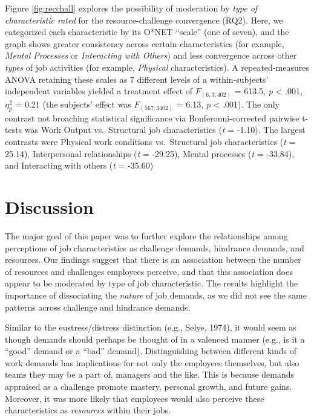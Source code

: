 \documentclass[
  jou]{apa6}
\begin{document}
Figure \ref{fig:recchall} explores the possibility of moderation by \emph{type of characteristic rated} for the resource-challenge convergence (RQ2). Here, we categorized each characteristic by its O*NET ``scale'' (one of seven), and the graph shows greater consistency across certain characteristics (for example, \emph{Mental Processes} or \emph{Interacting with Others}) and less convergence across other \emph{types} of job activities (for example, \emph{Physical} characteristics). A repeated-measures ANOVA retaining these scales as 7 different levels of a within-subjects' independent variables yielded a treatment effect of \(F_{(6, 3,402)}\) = 613.5, \emph{p} \textless{} .001, \(\eta^2_{p}\) = 0.21 (the subjects' effect was \(F_{(567, 3402)}\) = 6.13, \emph{p} \textless{} .001). The only contrast not broaching statistical significance via Bonferonni-corrected pairwise t-tests was Work Output vs.~Structural job characteristics (\emph{t} = -1.10). The largest contrasts were Physical work conditions vs.~Structural job characteristics (\emph{t} = 25.14), Interpersonal relationships (\emph{t} = -29.25), Mental processes (\emph{t} = -33.84), and Interacting with others (\emph{t} = -35.60)

\hypertarget{discussion}{%
\section{Discussion}\label{discussion}}

The major goal of this paper was to further explore the relationships among perceptions of job characteristics as challenge demands, hindrance demands, and resources. Our findings suggest that there is an association between the number of resources and challenges employees perceive, and that this association does appear to be moderated by type of job characteristic. The results highlight the importance of dissociating the \emph{nature} of job demands, as we did not see the same patterns across challenge and hindrance demands.

Similar to the eustress/distress distinction (e.g., Selye, 1974), it would seem as though demands should perhaps be thought of in a valenced manner (e.g., is it a ``good'' demand or a ``bad'' demand). Distinguishing between different kinds of work demands has implications for not only the employees themselves, but also teams they may be a part of, managers and the like. This is because demands appraised as a challenge promote mastery, personal growth, and future gains. Moreover, it was more likely that employees would also perceive these characteristics as \emph{resources} within their jobs.
\end{document}
